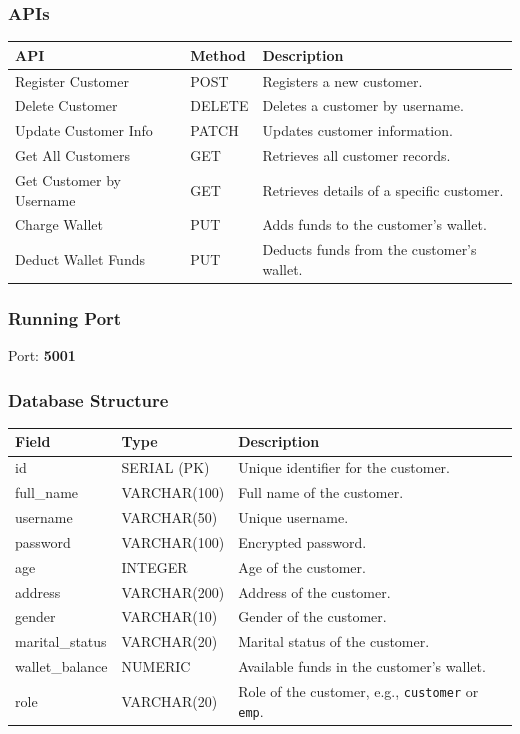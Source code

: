 \documentclass[a4paper,12pt]{article}
\begin{document}
\subsubsection{APIs}
\begin{longtable}{|p{4cm}|p{2cm}|p{7cm}|}
\hline
\textbf{API} & \textbf{Method} & \textbf{Description} \\
\hline
Register Customer & POST & Registers a new customer. \\
\hline
Delete Customer & DELETE & Deletes a customer by username. \\
\hline
Update Customer Info & PATCH & Updates customer information. \\
\hline
Get All Customers & GET & Retrieves all customer records. \\
\hline
Get Customer by Username & GET & Retrieves details of a specific customer. \\
\hline
Charge Wallet & PUT & Adds funds to the customer's wallet. \\
\hline
Deduct Wallet Funds & PUT & Deducts funds from the customer's wallet. \\
\hline
\end{longtable}

\subsubsection{Running Port}
Port: \textbf{5001}

\subsubsection{Database Structure}
\begin{longtable}{|p{3cm}|p{3cm}|p{8cm}|}
\hline
\textbf{Field} & \textbf{Type} & \textbf{Description} \\
\hline
id & SERIAL (PK) & Unique identifier for the customer. \\
\hline
full\_name & VARCHAR(100) & Full name of the customer. \\
\hline
username & VARCHAR(50) & Unique username. \\
\hline
password & VARCHAR(100) & Encrypted password. \\
\hline
age & INTEGER & Age of the customer. \\
\hline
address & VARCHAR(200) & Address of the customer. \\
\hline
gender & VARCHAR(10) & Gender of the customer. \\
\hline
marital\_status & VARCHAR(20) & Marital status of the customer. \\
\hline
wallet\_balance & NUMERIC & Available funds in the customer's wallet. \\
\hline
role & VARCHAR(20) & Role of the customer, e.g., \texttt{customer} or \texttt{emp}. \\
\hline
\end{longtable}
\end{document}
